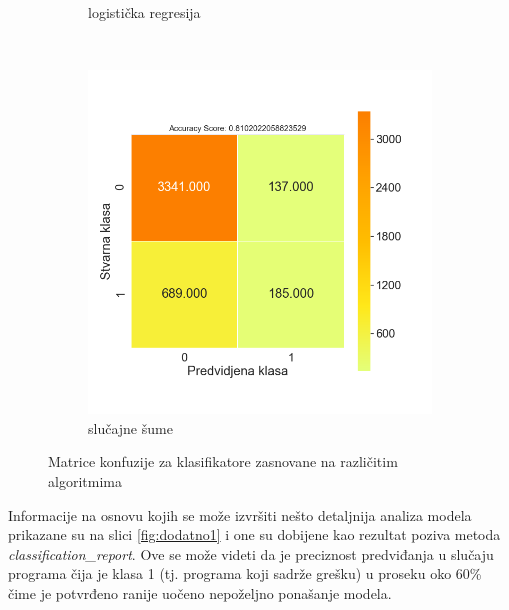 \documentclass[12pt,oneside]{memoir}
\begin{document}
\begin{figure}[!ht]
\begin{subfigure}[b]{0.45\textwidth}
        \caption{logistička regresija}
        \label{fig:logreg}
    \end{subfigure}
    \\
    \begin{subfigure}[b]{0.45\textwidth}
        \centering
        \includegraphics[width=\textwidth]{RF_basic_data_confussion_matrix}
        \caption{slučajne šume}
        \label{fig:randfor}
    \end{subfigure}
    \caption{Matrice konfuzije za klasifikatore zasnovane na različitim algoritmima}
    \label{fig:confmatr}
\end{figure}

Informacije na osnovu kojih se može izvršiti nešto detaljnija analiza modela prikazane su na slici \ref{fig:dodatno1} i one su dobijene kao rezultat poziva metoda \textit{classification\_report}. Ove se može videti da je preciznost predviđanja u slučaju programa čija je klasa 1 (tj. programa koji sadrže grešku) u proseku oko 60\% čime je potvrđeno ranije uočeno nepoželjno ponašanje modela. 
\end{document}
